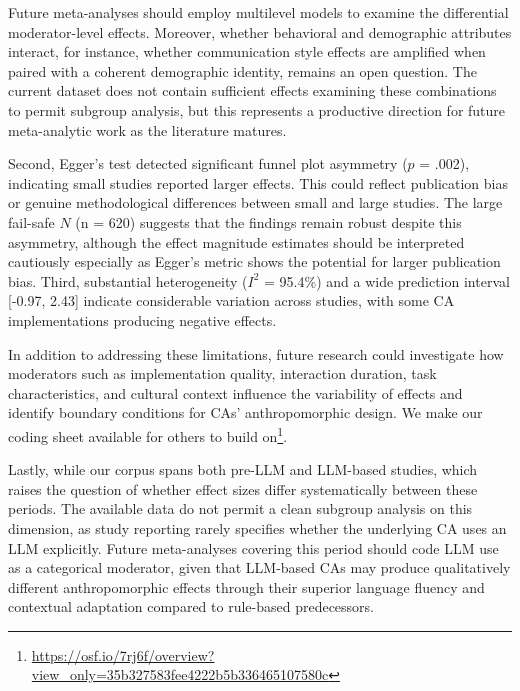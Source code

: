 \documentclass[manuscript,screen,review,anonymous]{acmart}
\DeclareRobustCommand{\change}[1]{%
    \textcolor{changeblue}{#1}%
  }
\DeclareRobustCommand{\change}[1]{#1}
\begin{document}
Future meta-analyses should employ multilevel models \cite{vandennoortgate2013} to examine the differential moderator-level effects. \change{Moreover, whether behavioral and demographic attributes interact, for instance, whether communication style effects are amplified when paired with a coherent demographic identity, remains an open question. The current dataset does not contain sufficient effects examining these combinations to permit subgroup analysis, but this represents a productive direction for future meta-analytic work as the literature matures.}

Second, Egger's test detected significant funnel plot asymmetry ($p$ = .002), indicating small studies reported larger effects. This could reflect publication bias or genuine methodological differences between small and large studies. The large fail-safe $N$ (n = 620) suggests that the findings remain robust despite this asymmetry, although the effect magnitude estimates should be interpreted cautiously especially as Egger's metric shows the potential for larger publication bias. Third, substantial heterogeneity ($I^2$ = 95.4\%) and a wide prediction interval [-0.97, 2.43] indicate considerable variation across studies, with some CA implementations producing negative effects. 

In addition to addressing these limitations, future research could investigate how moderators such as implementation quality, interaction duration, task characteristics, and cultural context influence the variability of effects and identify boundary conditions for CAs' anthropomorphic design. We make our coding sheet available for others to build on\footnote{\href{https://osf.io/7rj6f/overview?view_only=35b327583fee4222b5b336465107580c}{https://osf.io/7rj6f/overview?view\_only=35b327583fee4222b5b336465107580c}}.

\change{Lastly, while our corpus spans both pre-LLM and LLM-based studies, which raises the question of whether effect sizes differ systematically between these periods. The available data do not permit a clean subgroup analysis on this dimension, as study reporting rarely specifies whether the underlying CA uses an LLM explicitly. Future meta-analyses covering this period should code LLM use as a categorical moderator, given that LLM-based CAs may produce qualitatively different anthropomorphic effects through their superior language fluency and contextual adaptation compared to rule-based predecessors.}
\end{document}
